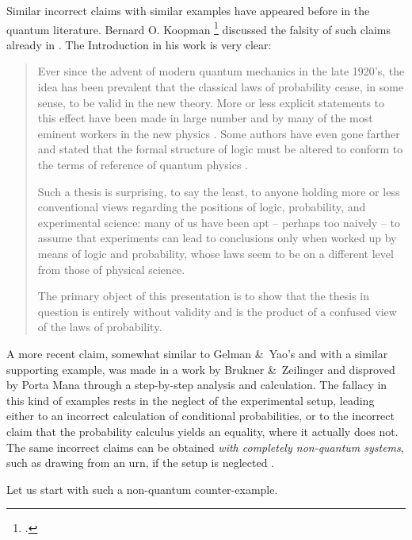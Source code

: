 \documentclass[\ifafour a4paper,12pt,\else a5paper,10pt,\fi%
onecolumn,oneside,article,%
british%
]{memoir}
\theoremstyle{remark}
\theoremstyle{innote}
\newcommand*{\citep}{\parencites}%
\newcommand*{\citey}{\parencites*}
\newcommand*{\amp}{\&}
\renewcommand*{\|}[1][]{\nonscript\,#1\vert\nonscript\;\mathopen{}}
\newcommand*{\sect}{\S}%
\begin{document}
Similar incorrect claims with similar examples have appeared before in the
quantum literature. Bernard O. Koopman \footcite[of the Pitman-Koopman
theorem for sufficient statistics,][]{koopman1936} discussed the
falsity of such claims already in \cite*{koopman1957}. The Introduction in
his work is very clear:
\begin{quotation}\footnotesize
  Ever since the advent of modern quantum mechanics in the late
  1920's, the idea has been prevalent that the classical laws of
  probability cease, in some sense, to be valid in the new theory. More or
  less explicit statements to this effect have been made in large number
  and by many of the most eminent workers in the new physics \textelp{}.
  Some authors have even gone farther and stated that the formal structure
  of logic must be altered to conform to the terms of reference of quantum
  physics \textelp{}.

  Such a thesis is surprising, to say the least, to anyone holding more or
  less conventional views regarding the positions of logic, probability,
  and experimental science: many of us have been apt -- perhaps too naively
  -- to assume that experiments can lead to conclusions only when worked up
  by means of logic and probability, whose laws seem to be on a different
  level from those of physical science.

  The primary object of this presentation is to show that the thesis in
  question is entirely without validity and is the product of a confused
  view of the laws of probability.
\end{quotation}

A more recent claim, somewhat similar to Gelman \amp\ Yao's and with a
similar supporting example, was made in a work by Brukner \amp\ Zeilinger
\citey{brukneretal2001} and disproved by Porta Mana
\citey{portamana2003_r2004} through a step-by-step analysis and
calculation.
The fallacy in this kind of examples rests in the neglect of the
experimental setup, leading either to an incorrect calculation of
conditional probabilities, or to the incorrect claim that the probability
calculus yields an equality, where it actually does not. The same incorrect
claims can be obtained \emph{with completely non-quantum systems}, such as
drawing from an urn, if the setup is neglected
\citep[\sect~IV]{portamana2003_r2004}.

Let us start with such a non-quantum counter-example.
\end{document}
